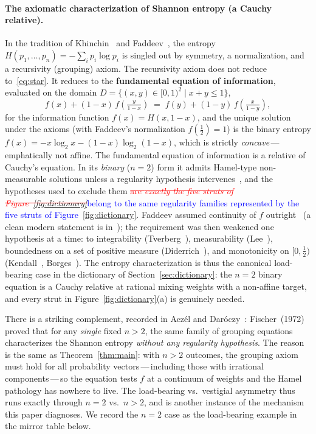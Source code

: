 \documentclass{article}
\newcommand{\ReviewAdd}[1]{\textcolor{blue}{#1}}
\newcommand{\ReviewDel}[1]{\textcolor{red}{\sout{#1}}}
\theoremstyle{plain}
\theoremstyle{definition}
\begin{document}
\paragraph{The axiomatic characterization of Shannon entropy (a Cauchy relative).}
In the tradition of Khinchin~\cite{Khinchin1957} and
Faddeev~\cite{Faddeev1957}, the entropy
$H(p_1,\ldots,p_n)=-\sum_i p_i\log p_i$ is singled out by symmetry, a
normalization, and a recursivity (grouping) axiom. The recursivity
axiom does not reduce to~\eqref{eq:star}. It reduces to the
\textbf{fundamental equation of information}, evaluated on the domain $D = \{(x, y) \in [0, 1)^2 \mid x + y \le 1\}$,
\[
f(x)+(1-x)\,f\!\left(\tfrac{y}{1-x}\right)
\;=\;f(y)+(1-y)\,f\!\left(\tfrac{x}{1-y}\right),
\]
for the information function $f(x)=H(x,1-x)$, and the unique solution
under the axioms (with Faddeev's normalization $f(\tfrac12)=1$) is the
binary entropy $f(x)=-x\log_2 x-(1-x)\log_2(1-x)$, which is strictly
\emph{concave}\,---\,emphatically not affine. The fundamental
equation of information is a relative of Cauchy's equation. In its
\emph{binary} ($n=2$) form it admits Hamel-type non-measurable
solutions unless a regularity hypothesis intervenes~\cite{AczelDaroczy1975},
and the hypotheses used to exclude them \ReviewDel{are \emph{exactly the five
struts of Figure~\ref{fig:dictionary}}}\ReviewAdd{belong to the same regularity families represented by the five struts of Figure~\ref{fig:dictionary}}. Faddeev assumed continuity of
$f$ outright~\cite{Faddeev1957} (a clean modern statement is
in~\cite{BaezFritzLeinster2011}); the requirement was then weakened
one hypothesis at a time: to integrability (Tverberg~\cite{Tverberg1958}),
measurability (Lee~\cite{Lee1964}), boundedness on a set of positive
measure (Diderrich~\cite{Diderrich1975}), and monotonicity on
$[0,\tfrac{1}{2})$ (Kendall~\cite{Kendall1964}, Borges~\cite{Borges1967}).
The entropy characterization is thus the canonical load-bearing case
in the dictionary of Section~\ref{sec:dictionary}: the $n=2$ binary
equation is a Cauchy relative at rational mixing weights with a
non-affine target, and every strut in Figure~\ref{fig:dictionary}(a)
is genuinely needed.

There is a striking complement, recorded in Acz\'el and
Dar\'oczy~\cite{AczelDaroczy1975}: Fischer~(1972) proved that for any
\emph{single} fixed $n>2$, the same family of grouping equations
characterizes the Shannon entropy \emph{without any regularity
hypothesis}. The reason is the same as Theorem~\ref{thm:main}: with
$n>2$ outcomes, the grouping axiom must hold for all probability
vectors\,---\,including those with irrational components\,---\,so the
equation tests $f$ at a continuum of weights and the Hamel pathology
has nowhere to live. The load-bearing vs.\ vestigial asymmetry thus
runs exactly through $n=2$ vs.\ $n>2$, and is another
instance of the mechanism this paper diagnoses. We record the $n=2$
case as the load-bearing example in the mirror table below.
\end{document}
